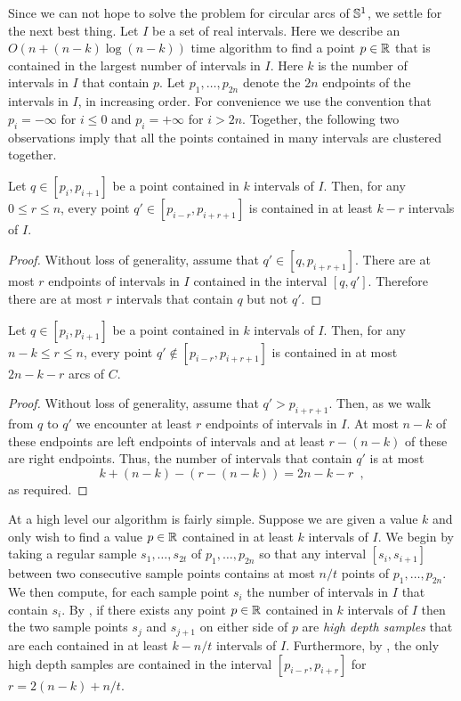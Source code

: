 \documentclass[charterfonts,lotsofwhite]{patmorin}
\begin{document}
Since we can not hope to solve the problem for circular arcs of
$\mathbb{S}^1$, we settle for the next best thing.  Let $I$ be a set of real
intervals.  Here we describe an $O(n+(n-k)\log (n-k))$ time algorithm
to find a point $p\in\mathbb{R}$ that is contained in the largest number of
intervals in $I$.  Here $k$ is the number of intervals in $I$ that
contain $p$.  Let $p_1,\ldots,p_{2n}$ denote the $2n$ endpoints of the
intervals in $I$, in increasing order.  For convenience we use the
convention that $p_i = -\infty$ for $i\le 0$ and $p_i=+\infty$ for $i
> 2n$.  Together, the following two observations imply that all the
points contained in many intervals are clustered together.

\begin{lem}
Let $q\in[p_i,p_{i+1}]$ be a point contained in $k$ intervals of $I$.
Then, for any $0\le r\le n$, every point $q'\in[p_{i-r},p_{i+r+1}]$ is
contained in at least $k-r$ intervals of $I$.
\end{lem}

\begin{proof}
Without loss of generality, assume that $q'\in[q,p_{i+r+1}]$.  There are
at most $r$ endpoints of intervals in $I$ contained in the interval
$[q,q']$.  Therefore there are at most $r$ intervals that contain $q$
but not $q'$.
\end{proof}

\begin{lem}
Let $q\in[p_i,p_{i+1}]$ be a point contained in $k$ intervals of $I$.
Then, for any $n-k \le r\le n$, every point $q'\notin[p_{i-r},p_{i+r+1}]$ 
is contained in at most $2n-k-r$ arcs of $C$.
\end{lem}

\begin{proof}
Without loss of generality, assume that $q'> p_{i+r+1}$.  Then, as we
walk from $q$ to $q'$ we encounter at least $r$ endpoints of intervals
in $I$.  At most $n-k$ of these endpoints are left endpoints of
intervals and at least $r-(n-k)$ of these are right endpoints.  Thus,
the number of intervals that contain $q'$ is at most
\[
      k + (n-k) - (r-(n-k)) = 2n - k - r \enspace ,
\]
as required.
\end{proof}

At a high level our algorithm is fairly simple.  Suppose we are given
a value $k$ and only wish to find a value $p\in\mathbb{R}$
contained in at least $k$ intervals of $I$.
We begin by taking a regular sample $s_1,\ldots,s_{2t}$ of
$p_1,\ldots,p_{2n}$ so that any interval $[s_i,s_{i+1}]$ between two
consecutive sample points contains at most $n/t$ points of
$p_1,\ldots,p_{2n}$.  We then compute, for each sample point $s_i$ the
number of intervals in $I$ that contain $s_i$.  By , if
there exists any point $p\in \mathbb{R}$ contained in $k$ intervals of $I$
then the two sample points $s_j$ and $s_{j+1}$ on either side of $p$
are \emph{high depth samples} that are each contained in at least
$k-n/t$ intervals of $I$.  Furthermore, by , the only high
depth samples are contained in the interval $[p_{i-r},p_{i+r}]$ for
$r=2(n-k)+n/t$.  
\end{document}
